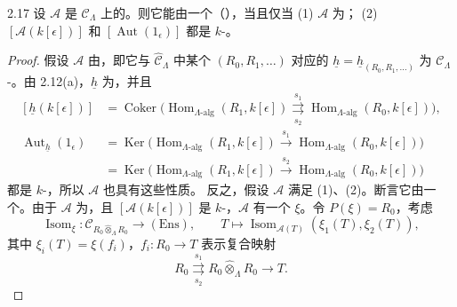 \begin{SGAresult}{}{2.17}
设 $\mathcal A$ 是 $\mathcal C_\Lambda$ 上的。则它能由一个（），当且仅当
(1) $\mathcal A$ 为；
(2) $[\mathcal A(k[\epsilon])]$ 和 $[\operatorname{Aut}(1_\epsilon)]$ 都是 $k$-。
\end{SGAresult}
\begin{proof}
假设 $\mathcal A$ 由，即它与 $\widehat{\mathcal C}_\Lambda$ 中某个 $(R_0,R_1,\ldots)$ 对应的 $\underline h=\underline h_{(R_0,R_1,\ldots)}$ 为 $\mathcal C_\Lambda$-。由 2.12(a)，$\underline h$ 为，并且
\[
\begin{aligned}
[\underline h(k[\epsilon])]
 &=\operatorname{Coker}\bigl(\operatorname{Hom}_{\Lambda\text{-alg}}(R_1,k[\epsilon])
 \underset{s_2}{\overset{s_1}{\rightrightarrows}}
 \operatorname{Hom}_{\Lambda\text{-alg}}(R_0,k[\epsilon])\bigr),\\
\operatorname{Aut}_{\underline h}(1_\epsilon)
 &=\operatorname{Ker}\bigl(\operatorname{Hom}_{\Lambda\text{-alg}}(R_1,k[\epsilon])
 \xrightarrow{s_1}\operatorname{Hom}_{\Lambda\text{-alg}}(R_0,k[\epsilon])\bigr)\\
 &=\operatorname{Ker}\bigl(\operatorname{Hom}_{\Lambda\text{-alg}}(R_1,k[\epsilon])
 \xrightarrow{s_2}\operatorname{Hom}_{\Lambda\text{-alg}}(R_0,k[\epsilon])\bigr)
\end{aligned}
\]
都是 $k$-，所以 $\mathcal A$ 也具有这些性质。
反之，假设 $\mathcal A$ 满足 (1)、(2)。断言它由一个。由于 $\mathcal A$ 为，且 $[\mathcal A(k[\epsilon])]$ 是 $k$-，$\mathcal A$ 有一个 $\xi$。令 $P(\xi)=R_0$，考虑
\[\operatorname{Isom}_\xi:\mathcal C_{R_0\widehat\otimes_\Lambda R_0}\longrightarrow(\mathrm{Ens}),\qquad
 T\longmapsto\operatorname{Isom}_{\mathcal A(T)}(\xi_1(T),\xi_2(T)),\]
其中 $\xi_i(T)=\xi(f_i)$，$f_i:R_0\to T$ 表示复合映射
\[R_0\underset{s_2}{\overset{s_1}{\rightrightarrows}}R_0\widehat\otimes_\Lambda R_0\longrightarrow T.\]

\end{proof}

